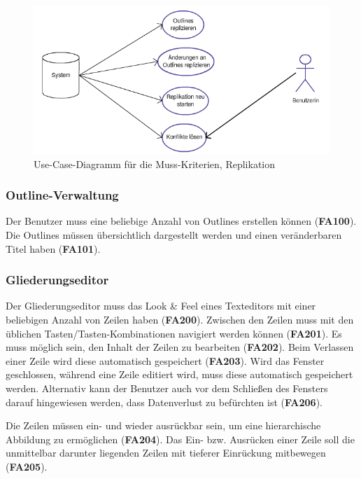 \medskip
\begin{figure}[ht] 
  \begin{center}
  \includegraphics[width=\textwidth]{grafik/usecasediagramm-muss-repl} 
  \end{center}
  \caption{Use-Case-Diagramm für die Muss-Kriterien, Replikation}
  \label{fig:usecasediagramm-muss-repl} 
\end{figure}

\subsubsection{Outline-Verwaltung}

Der Benutzer muss eine beliebige Anzahl von Outlines erstellen können (\textbf{FA100}). Die Outlines müssen übersichtlich dargestellt werden und einen veränderbaren Titel haben (\textbf{FA101}). 

\subsubsection{Gliederungseditor}
\label{subsec:gliederungseditor}

Der Gliederungseditor muss das Look \& Feel eines Texteditors mit einer beliebigen Anzahl von Zeilen haben (\textbf{FA200}). Zwischen den Zeilen muss mit den üblichen Tasten/Tasten-Kombinationen navigiert werden können (\textbf{FA201}). Es muss möglich sein, den Inhalt der Zeilen zu bearbeiten (\textbf{FA202}). Beim Verlassen einer Zeile wird diese automatisch gespeichert (\textbf{FA203}). Wird das Fenster geschlossen, während eine Zeile editiert wird, muss diese automatisch gespeichert werden. Alternativ kann der Benutzer auch vor dem Schließen des Fensters darauf hingewiesen werden, dass Datenverlust zu befürchten ist (\textbf{FA206}).

Die Zeilen müssen ein- und wieder ausrückbar sein, um eine hierarchische Abbildung zu ermöglichen (\textbf{FA204}). Das Ein- bzw. Ausrücken einer Zeile soll die unmittelbar darunter liegenden Zeilen mit tieferer Einrückung mitbewegen (\textbf{FA205}).

